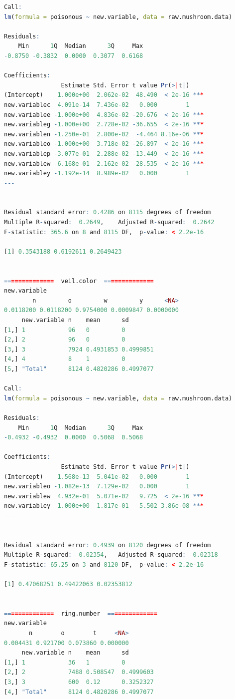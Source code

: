 \documentclass[12pt]{article}
\begin{document}
\begin{lstlisting}[language = R]
Call:
lm(formula = poisonous ~ new.variable, data = raw.mushroom.data)

Residuals:
    Min      1Q  Median      3Q     Max 
-0.8750 -0.3832  0.0000  0.3077  0.6168 

Coefficients:
                Estimate Std. Error t value Pr(>|t|)    
(Intercept)    1.000e+00  2.062e-02  48.490  < 2e-16 ***
new.variablec  4.091e-14  7.436e-02   0.000        1    
new.variablee -1.000e+00  4.836e-02 -20.676  < 2e-16 ***
new.variableg -1.000e+00  2.728e-02 -36.655  < 2e-16 ***
new.variablen -1.250e-01  2.800e-02  -4.464 8.16e-06 ***
new.variableo -1.000e+00  3.718e-02 -26.897  < 2e-16 ***
new.variablep -3.077e-01  2.288e-02 -13.449  < 2e-16 ***
new.variablew -6.168e-01  2.162e-02 -28.535  < 2e-16 ***
new.variabley -1.192e-14  8.989e-02   0.000        1    
---


Residual standard error: 0.4286 on 8115 degrees of freedom
Multiple R-squared:  0.2649,	Adjusted R-squared:  0.2642 
F-statistic: 365.6 on 8 and 8115 DF,  p-value: < 2.2e-16

[1] 0.3543188 0.6192611 0.2649423


==============  veil.color  ==============
new.variable
        n         o         w         y      <NA> 
0.0118200 0.0118200 0.9754000 0.0009847 0.0000000 
     new.variable n    mean      sd       
[1,] 1            96   0         0        
[2,] 2            96   0         0        
[3,] 3            7924 0.4931853 0.4999851
[4,] 4            8    1         0        
[5,] "Total"      8124 0.4820286 0.4997077

Call:
lm(formula = poisonous ~ new.variable, data = raw.mushroom.data)

Residuals:
    Min      1Q  Median      3Q     Max 
-0.4932 -0.4932  0.0000  0.5068  0.5068 

Coefficients:
                Estimate Std. Error t value Pr(>|t|)    
(Intercept)    1.568e-13  5.041e-02   0.000        1    
new.variableo -1.082e-13  7.129e-02   0.000        1    
new.variablew  4.932e-01  5.071e-02   9.725  < 2e-16 ***
new.variabley  1.000e+00  1.817e-01   5.502 3.86e-08 ***
---


Residual standard error: 0.4939 on 8120 degrees of freedom
Multiple R-squared:  0.02354,	Adjusted R-squared:  0.02318 
F-statistic: 65.25 on 3 and 8120 DF,  p-value: < 2.2e-16

[1] 0.47068251 0.49422063 0.02353812


==============  ring.number  ==============
new.variable
       n        o        t     <NA> 
0.004431 0.921700 0.073860 0.000000 
     new.variable n    mean      sd       
[1,] 1            36   1         0        
[2,] 2            7488 0.508547  0.4999603
[3,] 3            600  0.12      0.3252327
[4,] "Total"      8124 0.4820286 0.4997077


\end{lstlisting}
\end{document}
